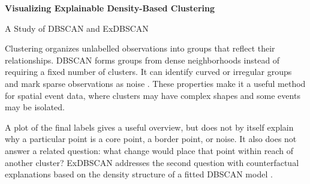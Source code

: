 \documentclass[11pt,a4paper]{article}
\makeatletter
\renewcommand{\section}{\@startsection{section}{1}{\z@}{1.7ex plus .5ex minus .2ex}{.7ex plus .2ex}{\normalfont\large\bfseries}}
\makeatother
\begin{document}
\begin{center}
    {\LARGE\bfseries Visualizing Explainable Density-Based Clustering\par}
    \vspace{4pt}
    {\large A Study of DBSCAN and ExDBSCAN\par}
\end{center}

\begin{abstract}
    DBSCAN identifies clusters of arbitrary shape and labels isolated observations as noise, but a cluster plot alone does not explain an individual assignment. We implement DBSCAN and the ExDBSCAN counterfactual procedure, and provide visual views of the overall clustering, a selected point's neighborhood, and a possible change in assignment. Controlled synthetic datasets and a snapshot of 1,260 Southern California earthquake locations are used to examine correctness, parameter sensitivity, and counterfactual feasibility. In the saved experiments, the greedy method returned 3,184 counterfactuals, all of which passed an independent target-neighborhood check. With one feature fixed, however, some requests had only partial results or no feasible result. The examples illustrate how explanations depend on the clustering parameters and on the constraints placed on a point. We additionally implement a positional robustness certificate and test fixed endpoints across nearby parameter settings, making the trade-off between movement cost and stability explicit.
\end{abstract}

\section{Introduction}
Clustering organizes unlabelled observations into groups that reflect their relationships. DBSCAN forms groups from dense neighborhoods instead of requiring a fixed number of clusters. It can identify curved or irregular groups and mark sparse observations as noise \cite{ester1996}. These properties make it a useful method for spatial event data, where clusters may have complex shapes and some events may be isolated.

A plot of the final labels gives a useful overview, but does not by itself explain why a particular point is a core point, a border point, or noise. It also does not answer a related question: what change would place that point within reach of another cluster? ExDBSCAN addresses the second question with counterfactual explanations based on the density structure of a fitted DBSCAN model \cite{matthews2026}.
\end{document}
